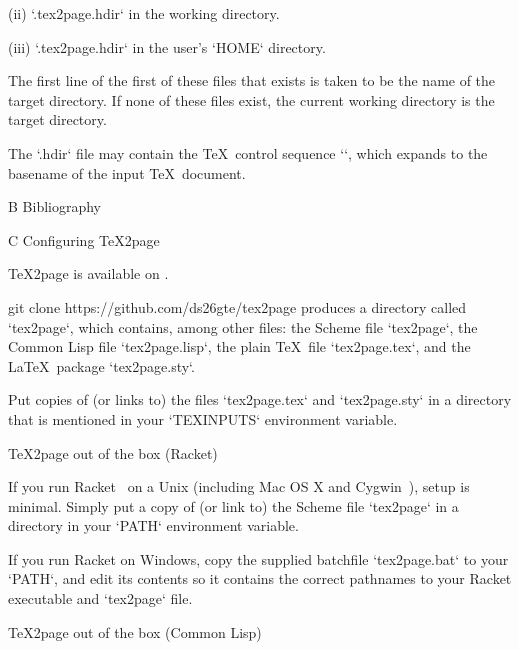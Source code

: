 \item(ii) `.tex2page.hdir` in the working directory.

\item(iii) `.tex2page.hdir` in the user’s `HOME` directory.

\n The first line of the first of these files that exists
is taken to be the name of the target directory.  If none of
these files exist, the current working directory is the target
directory.

The `.hdir` file may contain the \TeX\ control
sequence `\jobname`, which expands to the basename of
the input \TeX\ document.

\beginchapter  B Bibliography





\ifx\inpltdist\Undefined

\beginchapter  C Configuring \TeX2page

%
\TeX2page is available on
.

\begintt
git clone https://github.com/ds26gte/tex2page
\endtt
%
produces a directory
called `tex2page`, which contains, among other files:
the Scheme file `tex2page`, the Common Lisp file `tex2page.lisp`, the plain \TeX\ file
`tex2page.tex`, and the \LaTeX\ package
`tex2page.sty`.

Put copies of (or links to) the files
`tex2page.tex` and `tex2page.sty`  in a directory
that is mentioned in your `TEXINPUTS` environment
variable.

\beginsection \TeX2page out of the box (Racket)

%
If you run Racket~\cite{racket} on a Unix (including Mac OS X and
Cygwin~\cite{cygwin}), setup is minimal.  Simply put a copy of (or link to) the Scheme
file `tex2page` in a directory in your `PATH` environment variable.

If you run Racket on Windows,
copy the supplied batchfile `tex2page.bat`
to your `PATH`, and edit its contents so it contains
the correct pathnames to your Racket executable and
`tex2page` file.


\beginsection \TeX2page out of the box (Common Lisp)

